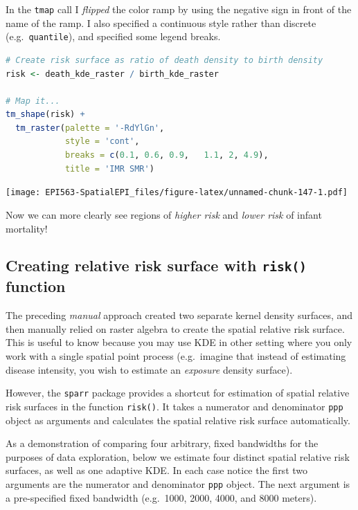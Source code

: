 \documentclass[
]{book}
\newcommand{\passthrough}[1]{#1}
\begin{document}
In the \passthrough{\lstinline!tmap!} call I \emph{flipped} the color ramp by using the negative sign in front of the name of the ramp. I also specified a continuous style rather than discrete (e.g.~\passthrough{\lstinline!quantile!}), and specified some legend breaks.

\begin{lstlisting}[language=R]
# Create risk surface as ratio of death density to birth density
risk <- death_kde_raster / birth_kde_raster

# Map it...
tm_shape(risk) + 
  tm_raster(palette = '-RdYlGn',
            style = 'cont',
            breaks = c(0.1, 0.6, 0.9,   1.1, 2, 4.9),
            title = 'IMR SMR') 
\end{lstlisting}

\texttt{[image: EPI563-SpatialEPI\_files/figure-latex/unnamed-chunk-147-1.pdf]}

Now we can more clearly see regions of \emph{higher risk} and \emph{lower risk} of infant mortality!

\hypertarget{creating-relative-risk-surface-with-risk-function}{%
\subsection{\texorpdfstring{Creating relative risk surface with \texttt{risk()} function}{Creating relative risk surface with risk() function}}\label{creating-relative-risk-surface-with-risk-function}}

The preceding \emph{manual} approach created two separate kernel density surfaces, and then manually relied on raster algebra to create the spatial relative risk surface. This is useful to know because you may use KDE in other setting where you only work with a single spatial point process (e.g.~imagine that instead of estimating disease intensity, you wish to estimate an \emph{exposure} density surface).

However, the \passthrough{\lstinline!sparr!} package provides a shortcut for estimation of spatial relative risk surfaces in the function \passthrough{\lstinline!risk()!}. It takes a numerator and denominator \passthrough{\lstinline!ppp!} object as arguments and calculates the spatial relative risk surface automatically.

As a demonstration of comparing four arbitrary, fixed bandwidths for the purposes of data exploration, below we estimate four distinct spatial relative risk surfaces, as well as one adaptive KDE. In each case notice the first two arguments are the numerator and denominator \passthrough{\lstinline!ppp!} object. The next argument is a pre-specified fixed bandwidth (e.g.~1000, 2000, 4000, and 8000 meters).
\end{document}

